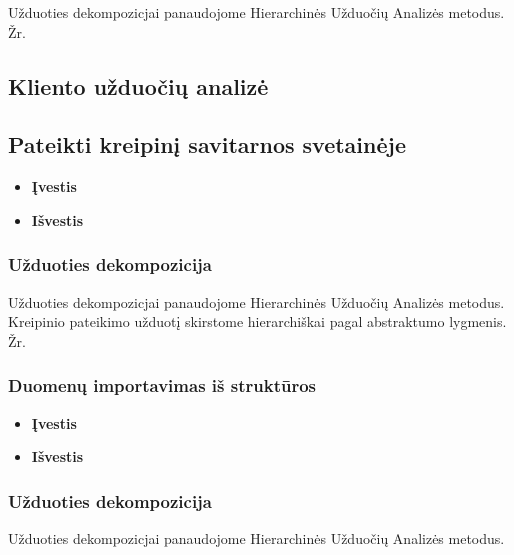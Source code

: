 	Užduoties dekompozicjai panaudojome Hierarchinės Užduočių Analizės metodus.
	Žr. 
	
\subsection{Kliento užduočių analizė}

	\subsection{Pateikti kreipinį savitarnos svetainėje}
		
		\begin{itemize}
			\item \textbf{Įvestis}
			\item \textbf{Išvestis} 
		\end{itemize}

	\subsubsection{Užduoties dekompozicija}

	Užduoties dekompozicjai panaudojome Hierarchinės Užduočių Analizės metodus.
	Kreipinio pateikimo užduotį skirstome hierarchiškai pagal abstraktumo lygmenis. Žr. 

	\subsubsection{Duomenų importavimas iš struktūros}

		\begin{itemize}
			\item \textbf{Įvestis}
			\item \textbf{Išvestis} 
		\end{itemize}
		
	\subsubsection{Užduoties dekompozicija}

	Užduoties dekompozicjai panaudojome Hierarchinės Užduočių Analizės metodus.
